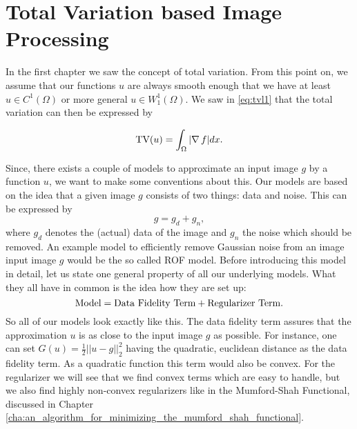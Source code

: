 \chapter{Total Variation based Image Processing} %
\label{cha:total_variation_based_image_processing}

    In the first chapter we saw the concept of total variation. From this point on, we assume that our functions $u$ are always smooth enough that we have at least $u \in C^{1}(\Omega)$ or more general $u \in W^{1}_{1}(\Omega)$. We saw in \ref{eq:tvl1} that the total variation can then be expressed by

        \begin{equation}
            \textnormal{TV}(u) = \int_{\Omega} |\nabla\,f| dx.
        \end{equation}

    Since, there exists a couple of models to approximate an input image $g$ by a function $u$, we want to make some conventions about this. Our models are based on the idea that a given image $g$ consists of two things: data and noise. This can be expressed by
        $$
            g = g_{d} + g_{n},
        $$
    where $g_{d}$ denotes the (actual) data of the image and $g_{n}$ the noise which should be removed. %
    An example model to efficiently remove Gaussian noise from an image input image $g$ would be the so called ROF model. Before introducing this model in detail, let us state one general property of all our underlying models. What they all have in common is the idea how they are set up:
        $$
            \textnormal{Model} = \textnormal{Data Fidelity Term} + \textnormal{Regularizer Term}.
        $$
    So all of our models look exactly like this. The data fidelity term assures that the approximation $u$ is as close to the input image $g$ as possible. For instance, one can set $G(u) = \frac{1}{2} ||u - g||_{2}^{2}$ having the quadratic, euclidean distance as the data fidelity term. As a quadratic function this term would also be convex. For the regularizer we will see that we find convex terms which are easy to handle, but we also find highly non-convex regularizers like in the Mumford-Shah Functional, discussed in Chapter \ref{cha:an_algorithm_for_minimizing_the_mumford_shah_functional}.

    

